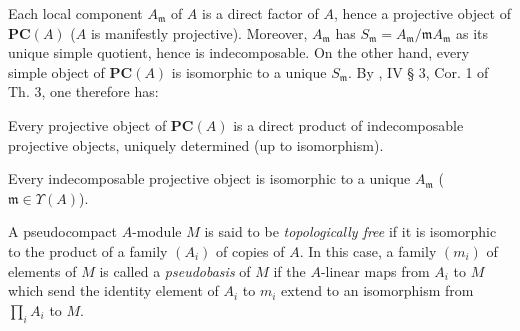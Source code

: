 Each local component $A_{\mathfrak m}$ of $A$ is a direct factor of $A$, hence a projective object of $\mathbf{PC}(A)$ ($A$ is manifestly projective). Moreover, $A_{\mathfrak m}$ has $S_{\mathfrak m}=A_{\mathfrak m}/\mathfrak m A_{\mathfrak m}$ as its unique simple quotient, hence is indecomposable. On the other hand, every simple object of $\mathbf{PC}(A)$ is isomorphic to a unique $S_{\mathfrak m}$. By \cite{CA}, IV § 3, Cor. 1 of Th. 3, one therefore has:
\begin{proposition}{}
\begin{enumeratei}
\item Every projective object of $\mathbf{PC}(A)$ is a direct product of indecomposable projective objects, uniquely determined (up to isomorphism).
\item Every indecomposable projective object is isomorphic to a unique $A_{\mathfrak m}$ ($\mathfrak m\in\Upsilon(A)$).
\end{enumeratei}
\end{proposition}
\begin{definition}{}
A pseudocompact $A$-module $M$ is said to be \emph{topologically free} if it is isomorphic to the product of a family $(A_i)$ of copies of $A$.
In this case, a family $(m_i)$ of elements of $M$ is called a \emph{pseudobasis} of $M$ if the $A$-linear maps from $A_i$ to $M$ which send the identity element of $A_i$ to $m_i$ extend to an isomorphism from $\prod_i A_i$ to $M$.
\end{definition}

